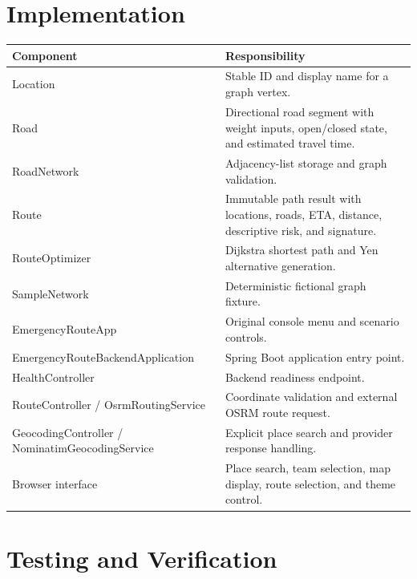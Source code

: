 \documentclass[11pt,a4paper]{article}
\begin{document}
\section{Implementation}
\begin{tabularx}{\textwidth}{>{\ttfamily}p{} X}
\toprule
\textbf{Component} & \textbf{Responsibility}\\
\midrule
Location & Stable ID and display name for a graph vertex.\\
Road & Directional road segment with weight inputs, open/closed state, and estimated travel time.\\
RoadNetwork & Adjacency-list storage and graph validation.\\
Route & Immutable path result with locations, roads, ETA, distance, descriptive risk, and signature.\\
RouteOptimizer & Dijkstra shortest path and Yen alternative generation.\\
SampleNetwork & Deterministic fictional graph fixture.\\
EmergencyRouteApp & Original console menu and scenario controls.\\
EmergencyRouteBackendApplication & Spring Boot application entry point.\\
HealthController & Backend readiness endpoint.\\
RouteController / OsrmRoutingService & Coordinate validation and external OSRM route request.\\
GeocodingController / NominatimGeocodingService & Explicit place search and provider response handling.\\
Browser interface & Place search, team selection, map display, route selection, and theme control.\\
\bottomrule
\end{tabularx}

\section{Testing and Verification}
\end{document}
